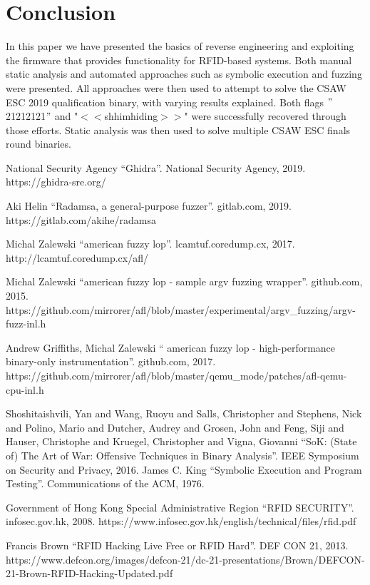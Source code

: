 \documentclass[conference]{IEEEtran}
\begin{document}
\section{Conclusion}
\label{sec:Concl}
In this paper we have presented the basics of reverse engineering and exploiting the firmware that provides functionality for RFID-based systems. Both manual static analysis and automated approaches such as symbolic execution and fuzzing were presented. All approaches were then used to attempt to solve the CSAW ESC 2019 qualification binary, with varying results explained. Both flags $"$21212121$"$ and "$<$$<$shhimhiding$>$$>$" were successfully recovered through those efforts. Static analysis was then used to solve multiple CSAW ESC finals round binaries. 


\begin{thebibliography}{00}
 National Security Agency ``Ghidra''. National Security Agency, 2019. https://ghidra-sre.org/

 Aki Helin ``Radamsa, a general-purpose fuzzer''. gitlab.com, 2019. https://gitlab.com/akihe/radamsa

 Michal Zalewski ``american fuzzy lop''. lcamtuf.coredump.cx, 2017. http://lcamtuf.coredump.cx/afl/

 Michal Zalewski ``american fuzzy lop - sample argv fuzzing wrapper''. github.com, 2015. https://github.com/mirrorer/afl/blob/master/experimental/argv\_fuzzing/argv-fuzz-inl.h

 Andrew Griffiths, Michal Zalewski ``   american fuzzy lop - high-performance binary-only instrumentation''. github.com, 2017. https://github.com/mirrorer/afl/blob/master/qemu\_mode/patches/afl-qemu-cpu-inl.h

 Shoshitaishvili, Yan and Wang, Ruoyu and Salls, Christopher and Stephens, Nick and Polino, Mario and Dutcher, Audrey and Grosen, John and Feng, Siji and Hauser, Christophe and Kruegel, Christopher and Vigna, Giovanni ``SoK: (State of) The Art of War: Offensive Techniques in Binary Analysis''. IEEE Symposium on Security and Privacy, 2016. 
 James C. King ``Symbolic Execution and Program Testing''. Communications of the ACM, 1976. 

 Government of Hong Kong Special Administrative Region ``RFID SECURITY''. infosec.gov.hk, 2008. https://www.infosec.gov.hk/english/technical/files/rfid.pdf

 Francis Brown ``RFID Hacking Live Free or RFID Hard''. DEF CON 21, 2013. https://www.defcon.org/images/defcon-21/dc-21-presentations/Brown/DEFCON-21-Brown-RFID-Hacking-Updated.pdf
\end{thebibliography}
\vspace{12pt}
\end{document}
